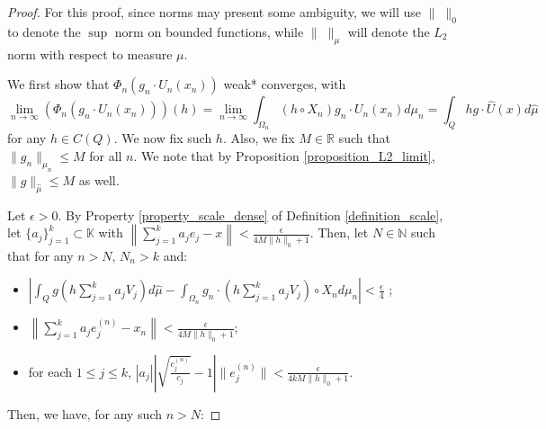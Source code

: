 \documentclass{amsart}
\theoremstyle{definition}
\theoremstyle{remark}
\def \HMU{\hat{\mu}}
\def \HU{\hat{U}}
\begin{document}
\begin{proof}
	For this proof, since norms may present some ambiguity, we will use $\|\; \|_0$ to denote the $\sup$ norm on bounded functions, while $\|\; \|_{\mu}$ will denote the $L_2$ norm with respect to measure $\mu$.
	
	We first show that $\Phi_n(g_n\cdot U_n(x_n))$ weak* converges, with $$\lim_{n\rightarrow\infty} (\Phi_n(g_n\cdot U_n(x_n)))(h)=\lim_{n\rightarrow\infty}\int_{\Omega_n} (h\circ X_n)g_n\cdot U_n(x_n)d\mu_n=\int_{Q}hg\cdot\HU(x)d\HMU$$ for any $h\in C(Q)$. We now fix such $h$. Also, we fix $M\in\mathbb{R}$ such that $\|g_n\|_{\mu_n}\leq M$ for all $n$. We note that by Proposition \ref{proposition_L2_limit}, $\|g\|_{\HMU}\leq M$ as well.
	
	Let $\epsilon>0$.  By Property \ref{property_scale_dense} of Definition \ref{definition_scale}, let $\{a_j \}_{j=1}^k\subset\mathbb{K}$ with  $\left\|\sum_{j=1}^ka_je_j-x \right\|<\frac{\epsilon}{4M\|h\|_0+1}$. Then, let $N\in\mathbb{N}$ such that for any $n>N$, $N_n>k$ and:
	\begin{itemize}
		\item $\left|\int_{Q}g\left(h\sum_{j=1}^ka_jV_j\right)d\HMU-\int_{\Omega_n}g_n\cdot\left(h\sum_{j=1}^ka_jV_j\right)\circ X_nd\mu_n \right|<\frac{\epsilon}{4}$ ;
		\item $\left\|\sum_{j=1}^ka_je_j^{(n)}-x_n \right\|<\frac{\epsilon}{4M\|h\|_0+1}$;
		\item for each $1\leq j\leq k$, $|a_j|\left|\sqrt{\frac{c_j^{(n)}}{c_j}}-1\right|\|e_j^{(n)}\|<\frac{\epsilon}{4kM\|h\|_0+1}$.
	\end{itemize}
	Then, we have, for any such $n>N$:
	

\end{proof}
\end{document}
